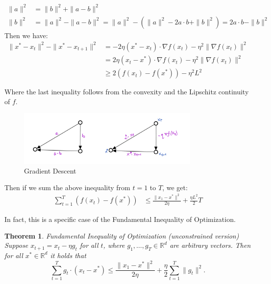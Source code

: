 \documentclass[11pt]{book} %
\newtheorem{theorem}{Theorem}[section]
\begin{document}
\begin{align*}
    \|a\|^2  &= \|b\|^2 + \|a - b\|^2   \\ 
    \|b\|^2 &= \|a\|^2 - \|a - b\|^2 = \|a\|^2 - ( \|a\|^2 - 2a \cdot b + \|b\|^2  ) = 2 a \cdot b - \|b\|^2
\end{align*}
Then we have:
\begin{align*}
    \| x^* - x_t \|^2 - \| x^* - x_{t+1} \|^2 &= - 2 \eta (x^* - x_t) \cdot \nabla f(x_t) - \eta^2 \| \nabla f(x_t) \|^2 \\
    &= 2 \eta (x_t - x^*) \cdot \nabla f(x_t) - \eta^2 \| \nabla f(x_t) \|^2 \\
    &\geq  2 ( f(x_t) - f(x^*) ) - \eta^2 L^2
\end{align*}

Where the last inequality follows from the convexity and the Lipschitz continuity of $f$. 

\begin{figure}[H]
    \centering
    \includegraphics[width=0.8\textwidth]{Figs/vectors_triangle.jpeg}
    \caption{Gradient Descent}
\end{figure}

Then if we sum the above inequality from $t=1$ to $T$, we get:
\begin{align*}
    \sum_{t=1}^T ( f(x_t) - f(x^*) ) &\leq \frac{\|x_1 - x^*\|^2}{2 \eta} + \frac{\eta L^2}{2} T 
\end{align*}

In fact, this is a specific case of the Fundamental Inequality of Optimization. 

\begin{theorem}{Fundamental Inequality of Optimization (unconstrained version)} \\
    Suppose \( x_{t+1} = x_t - \eta g_t \) for all \( t \), where \( g_1, \ldots, g_T \in \mathbb{R}^d \) are arbitrary vectors. Then for all \( x^* \in \mathbb{R}^d \) it holds that
    \[
    \sum_{t=1}^T g_t \cdot (x_t - x^*) \leq \frac{\|x_1 - x^*\|^2}{2\eta} + \frac{\eta}{2} \sum_{t=1}^T \|g_t\|^2.
    \]
\end{theorem}
    
\end{document}
